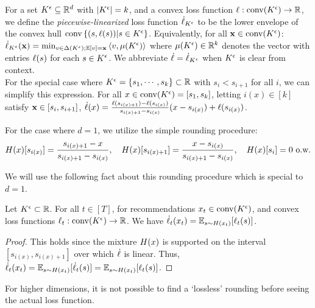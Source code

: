 \documentclass[final,12pt]{alt2025}
\begin{document}
\begin{definition}\label{def:piece-lin}
    For a set $K^{\epsilon} \subseteq \mathbb{R}^d$ with $\left|K^{\epsilon}\right|=k$, and a convex loss function $\ell: \mathrm{conv}(K^{\epsilon}) \to \mathbb{R}$, we define the \emph{piecewise-linearized} loss function $\dot{\ell}_{K^{\epsilon}}$ to be the lower envelope of the convex hull $\mathrm{conv} \left\{(s,\ell(s))|s \in K^{\epsilon}\right\}$.  Equivalently, for all $\mathbf{x} \in \mathrm{conv}(K^{\epsilon})$:
    $\dot{\ell}_{K^{\epsilon}}(\mathbf{x}) = \min_{v \in \Delta(K^{\epsilon}); \mathbb{E}[v] = \mathbf{x}} \left \langle v,\mu(K^{\epsilon}) \right \rangle$
    where $\mu (K^{\epsilon}) \in \mathbb{R}^k$ denotes the vector with entries $\ell(s)$ for each $s \in K^{\epsilon}$.  We abbreviate $\dot{\ell} = \dot{\ell}_{K^{\epsilon}}$ when $K^{\epsilon}$ is clear from context.\\
    
    For the special case where $K^{\epsilon} = \left\{s_1,\cdots,s_k\right\} \subset \mathbb{R}$ with $s_i<s_{i+1}$ for all $i$,  we can simplify this expression.  For all $x \in \mathrm{conv}(K^{\epsilon}) = [s_1,s_k]$, letting $i(x)\in [k]$ satisfy $\mathbf{x} \in [s_i,s_{i+1}]$, $
        \dot{\ell}(x) = \frac{\ell(s_{i(x)+1})-\ell(s_{i(x)})}{s_{i(x)+1}-s_{i(x)}}(x-s_{i(x)})+\ell(s_{i(x)})$.
\end{definition}

For the case where $d=1$, we utilize the simple rounding procedure:
\begin{equation}\label{eq:nearly-rounding}
    H(x)[s_{i(x)}] = \frac{s_{i(x)+1}-x}{s_{i(x)+1}-s_{i(x)}}, \quad
    H(x)[s_{i(x)+1}] = \frac{x-s_{i(x)}}{s_{i(x)+1}-s_{i(x)}}, \quad 
    H(x)[s_{i}] = 0 \text{ o.w.}
\end{equation}

We will use the following fact about this rounding procedure which is special to $d=1$.

\begin{lemma}\label{lemma:KH}
    Let $K^{\epsilon} \subset \mathbb{R}$.  For all $t \in [T]$, for recommendations $x_{t} \in \mathrm{conv}(K^{\epsilon})$, and convex loss functions $\ell_{t}: \mathrm{conv}(K^{\epsilon}) \to \mathbb{R}$.  We have $\dot{\ell}_t(x_t) = \mathbb{E}_{s \sim H(x_t)}[\ell_t(s)]$.
    
    
    
\end{lemma}

\begin{proof}
    This holds since the mixture $H(x)$ is supported on the interval $[s_{i(x)},s_{i(x)+1}]$ over which $\dot{\ell}$ is linear.  Thus, $ \dot{\ell}_t(x_t) = \mathbb{E}_{s \sim H(x_t)}[\dot{\ell}_t(s)]= \mathbb{E}_{s \sim H(x_t)}[\ell_t(s)]$.
\end{proof}

For higher dimensions, it is not possible to find a `lossless' rounding before seeing the actual loss function.
\end{document}
